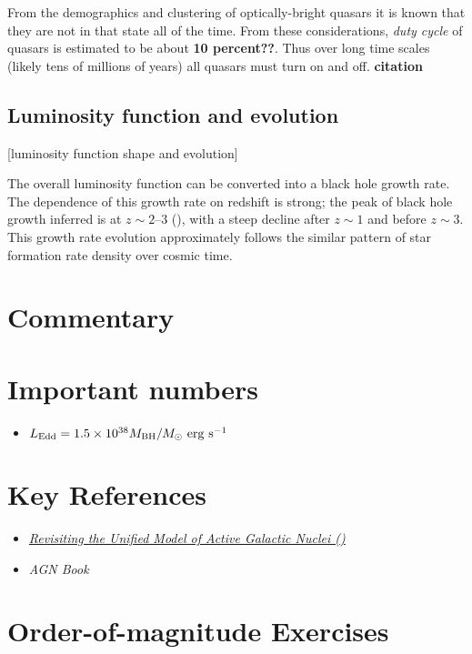From the demographics and clustering of optically-bright quasars it is
known that they are not in that state all of the time. From these
considerations, {\it duty cycle} of quasars is estimated to be about
{\bf 10 percent??}. Thus over long time scales (likely tens of
millions of years) all quasars must turn on and off. {\bf citation}

\subsection{Luminosity function and evolution}

[luminosity function shape and evolution]

The overall luminosity function can be converted into a black hole
growth rate. The dependence of this growth rate on redshift is
strong; the peak of black hole growth inferred is at $z\sim 2$--3
(\citealt{shankar09a}), with a steep decline after $z\sim 1$ and
before $z\sim 3$. This growth rate evolution approximately follows the
similar pattern of star formation rate density over cosmic time.

\section{Commentary}

\section{Important numbers}

\begin{itemize}
\item $L_{\rm Edd} = 1.5 \times 10^{38} M_{\rm BH} / M_\odot {\rm
~erg~s}^{-1}$
\end{itemize}

\section{Key References}

\begin{itemize}
  \item
    \href{https://ui.adsabs.harvard.edu/abs/2015ARA%26A..53..365N/abstract}
    {{\it Revisiting the Unified Model of Active Galactic Nuclei
      (\citealt{netzer15a})}}
  \item
    {\it AGN Book}
\end{itemize}

\section{Order-of-magnitude Exercises}

